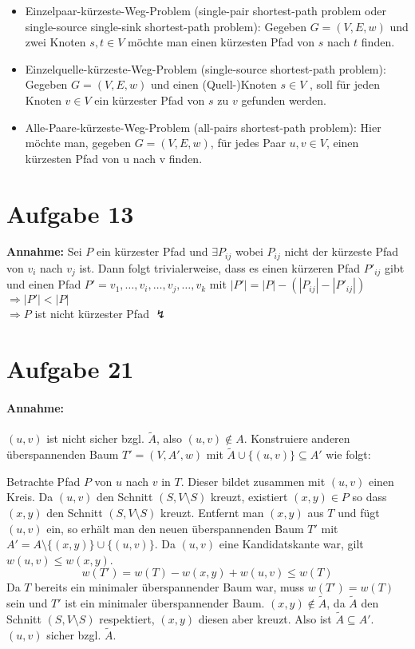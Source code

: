 \documentclass[10pt,a4paper]{article}
\begin{document}
    \begin{itemize}
        \item   Einzelpaar-kürzeste-Weg-Problem (single-pair shortest-path problem oder
        single-source single-sink shortest-path problem): Gegeben $G = (V, E, w)$ und zwei
        Knoten $s,t \in V$ möchte man einen kürzesten Pfad von  $s$ nach $t$ finden.
        \item Einzelquelle-kürzeste-Weg-Problem (single-source shortest-path problem):
        Gegeben $G = (V, E, w)$ und einen (Quell-)Knoten $s \in V$ , soll für jeden Knoten $v \in V$
        ein kürzester Pfad von $s$ zu $v$ gefunden werden.
        \item Alle-Paare-kürzeste-Weg-Problem (all-pairs shortest-path problem): Hier möchte
		man, gegeben $G = (V, E, w)$, für jedes Paar $u,v \in V$, einen kürzesten Pfad von u nach v
		finden.
	\end{itemize}

\section*{Aufgabe 13}
    \textbf{Annahme: } Sei $P$ ein kürzester Pfad und $\exists P_{ij}$
    wobei $P_{ij}$ nicht der kürzeste Pfad von $v_i$ nach $v_j$ ist.
    Dann folgt trivialerweise, dass es einen kürzeren Pfad $P'_{ij}$ gibt
    und einen Pfad $P' = v_1, \ldots, v_i, \ldots, v_j, \ldots, v_k$ mit 
    $|P'| = |P| - (|P_{ij}| - |P'_{ij}|)$ \\ $\Rightarrow |P'| < |P|$
    \\ $\Rightarrow P$ ist nicht kürzester Pfad $\lightning$



\section*{Aufgabe 21}
	\paragraph{Annahme:} $(u,v)$ ist nicht sicher bzgl. $\tilde{A}$, also $(u, v) \notin A$.
	Konstruiere anderen überspannenden Baum $T' = (V, A', w)$ mit $\tilde{A} \cup \{(u,v)\} \subseteq A'$ wie folgt:
	
	Betrachte Pfad $P$ von $u$ nach $v$ in $T$. Dieser bildet zusammen mit $(u, v)$ einen Kreis.
	Da $(u,v)$ den Schnitt $(S, V \setminus S)$ kreuzt, existiert $(x, y) \in P$ so dass $(x, y)$ den Schnitt $(S, V \setminus S)$ kreuzt.
	Entfernt man $(x,y)$ aus $T$ und fügt $(u,v)$ ein, so erhält man den neuen überspannenden Baum $T'$
	mit $A' = A \setminus \{(x, y)\} \cup \{(u, v)\}$.
	Da $(u, v)$ eine Kandidatskante war, gilt $w(u,v) \leq w(x, y)$.
	\begin{equation*}
	w(T') = w(T) - w(x, y) + w(u,v) \leq w(T)
	\end{equation*}
	Da $T$ bereits ein minimaler überspannender Baum war, muss $w(T') = w(T)$ sein und $T'$ ist ein minimaler überspannender Baum.
	$(x, y) \notin \tilde{A}$, da $\tilde{A}$ den Schnitt $(S, V \setminus S)$ respektiert, $(x, y)$ diesen aber kreuzt.
	Also ist $\tilde{A} \subseteq A'$. $(u, v)$ sicher bzgl. $\tilde{A}$.
\end{document}

